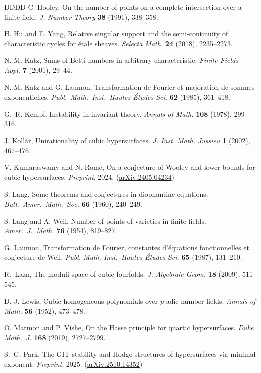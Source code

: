 \documentclass[a4paper,11pt, twoside,reqno]{amsart}
\theoremstyle{plain}
\theoremstyle{definition}
\theoremstyle{remark}
\numberwithin{equation}{section}
\begin{document}
\begin{thebibliography}{DDDD}
C. Hooley,
On the number of points on a complete intersection over a finite field.
{\em J. Number Theory} {\bf 38} (1991), 338--358.


H. Hu and E. Yang,
Relative singular support and the semi-continuity of
characteristic cycles for \'etale sheaves. 
{\em Selecta Math.} {\bf 24} (2018), 2235--2273.

N. M. Katz, Sums of Betti numbers in arbitrary characteristic.
{\em Finite Fields Appl.} {\bf 7} (2001), 29--44.


 N. M. Katz and G. Laumon, Transformation de {F}ourier et majoration de sommes exponentielles. {\em Publ.\ Math.\ Inst.\ Hautes \'{E}tudes Sci.} {\bf 62} (1985), 361--418.

G.~R. Kempf, Instability in invariant theory.
{\em Annals of Math.} \textbf{108} (1978), 299--316.

J. Koll\'ar, Unirationality of cubic hypersurfaces. {\em J. Inst. Math. Jussieu} {\bf 1} (2002),  467--476.

V. Kumaraswamy and 
N. Rome, 
On a conjecture of Wooley and lower bounds for cubic hypersurfaces. {\em Preprint}, 2024.
(\href{https://arxiv.org/abs/2405.04234}{arXiv:2405.04234})


S. Lang, 
Some theorems and conjectures in diophantine equations.
{\em Bull.\ Amer.\ Math.\ Soc.} {\bf 66} (1960), 240--249.

S. Lang and A. Weil,
Number of points of varieties in finite fields.
{\em Amer.\ J.\ Math.}  {\bf 76}  (1954), 819--827.


G. Laumon, Transformation de Fourier, constantes d'\'equations
fonctionnelles et conjecture de Weil.
\emph{Publ. Math. Inst.\ Hautes \'{E}tudes Sci.} \textbf{65} (1987), 131--210.

R.~Laza, The moduli space of cubic fourfolds. 
\emph{J. Algebraic Geom.} \textbf{18} (2009),  511--545.

D. J. Lewis, Cubic homogeneous polynomials over $p$-adic number fields.
{\em Annals of Math.} {\bf 56} (1952), 473--478.

O. Marmon and P. Vishe, On the Hasse principle for quartic hypersurfaces. 
{\em Duke Math.\ J.} {\bf 168} (2019), 2727--2799.

S.~G. Park,
The GIT stability and Hodge structures of hypersurfaces
via minimal exponent. 
{\em Preprint}, 2025.
(\href{https://arxiv.org/abs/2510.14352}{arXiv:2510.14352})



\end{thebibliography}
\end{document}
